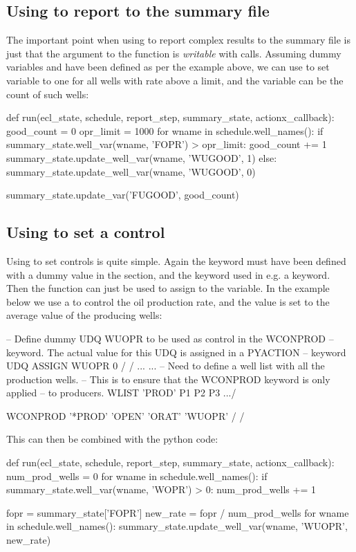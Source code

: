 \subsection{Using \pyaction{} to report to the summary file}
The important point when using \pyaction{} to report complex results to the
summary file is just that the  argument to the
 function is \emph{writable} with 
calls. Assuming dummy \udq{} variables  and  have been
defined as per the example above, we can use \pyaction{} to set variable
 to one for all wells with rate above a limit, and the 
variable can be the count of such wells:
\begin{code}
def run(ecl_state, schedule, report_step, summary_state, actionx_callback):
    good_count = 0
    opr_limit = 1000
    for wname in schedule.well_names():
        if summary_state.well_var(wname, 'FOPR') > opr_limit:
            good_count += 1
            summary_state.update_well_var(wname, 'WUGOOD', 1)
        else:
            summary_state.update_well_var(wname, 'WUGOOD', 0)

    summary_state.update_var('FUGOOD', good_count)
\end{code}



\subsection{Using \pyaction{} to set a  control}
Using \pyaction{} to set  controls is quite simple. Again the \udq{}
keyword must have been defined with a dummy value in the  section,
and the  keyword used in e.g. a  keyword. Then the
 function can just be used to assign to the \udq{} variable.
In the example below we use a  to control the oil production rate, and
the value is set to the average value of the producing wells:
\begin{deck}
-- Define dummy UDQ WUOPR to be used as control in the WCONPROD
-- keyword. The actual value for this UDQ is assigned in a PYACTION
-- keyword
UDQ
   ASSIGN WUOPR 0 /
/
...
...
-- Need to define a well list with all the production wells.
-- This is to ensure that the WCONPROD keyword is only applied
-- to producers.
WLIST
  'PROD'  P1 P2 P3 .../

WCONPROD
   '*PROD'  'OPEN'  'ORAT'  'WUOPR' /
/
\end{deck}
This can then be combined with the python code:
\begin{code}
def run(ecl_state, schedule, report_step, summary_state, actionx_callback):
    num_prod_wells = 0
    for wname in schedule.well_names():
        if summary_state.well_var(wname, 'WOPR') > 0:
            num_prod_wells += 1

    fopr = summary_state['FOPR']
    new_rate = fopr / num_prod_wells
    for wname in schedule.well_names():
        summary_state.update_well_var(wname, 'WUOPR', new_rate)
\end{code}


